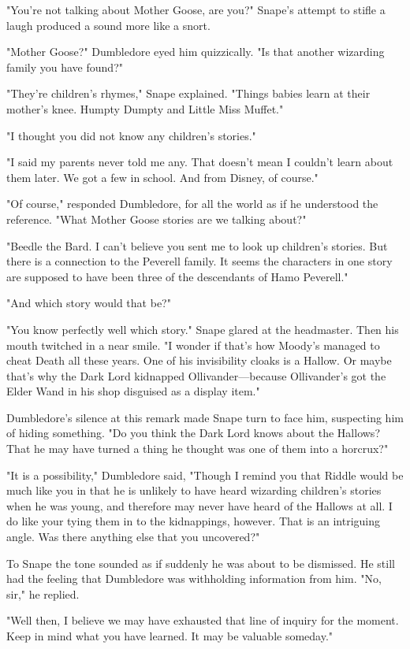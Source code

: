 "You're not talking about Mother Goose, are you?" Snape's attempt to stifle a laugh produced a sound more like a snort.

"Mother Goose?" Dumbledore eyed him quizzically. "Is that another wizarding family you have found?"

"They're children's rhymes," Snape explained. "Things babies learn at their mother's knee. Humpty Dumpty and Little Miss Muffet."

"I thought you did not know any children's stories."

"I said my parents never told me any. That doesn't mean I couldn't learn about them later. We got a few in school. And from Disney, of course."

"Of course," responded Dumbledore, for all the world as if he understood the reference. "What Mother Goose stories are we talking about?"

"Beedle the Bard. I can't believe you sent me to look up children's stories. But there is a connection to the Peverell family. It seems the characters in one story are supposed to have been three of the descendants of Hamo Peverell."

"And which story would that be?"

"You know perfectly well which story." Snape glared at the headmaster. Then his mouth twitched in a near smile. "I wonder if that's how Moody's managed to cheat Death all these years. One of his invisibility cloaks is a Hallow. Or maybe that's why the Dark Lord kidnapped Ollivander—because Ollivander's got the Elder Wand in his shop disguised as a display item."

Dumbledore's silence at this remark made Snape turn to face him, suspecting him of hiding something. "Do you think the Dark Lord knows about the Hallows? That he may have turned a thing he thought was one of them into a horcrux?"

"It is a possibility," Dumbledore said, "Though I remind you that Riddle would be much like you in that he is unlikely to have heard wizarding children's stories when he was young, and therefore may never have heard of the Hallows at all. I do like your tying them in to the kidnappings, however. That is an intriguing angle. Was there anything else that you uncovered?"

To Snape the tone sounded as if suddenly he was about to be dismissed. He still had the feeling that Dumbledore was withholding information from him. "No, sir," he replied.

"Well then, I believe we may have exhausted that line of inquiry for the moment. Keep in mind what you have learned. It may be valuable someday."

